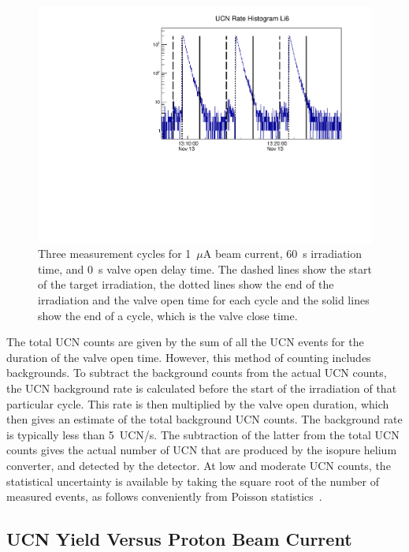 \begin{figure}[h!]
  \centering
  \includegraphics[width=1.0\textwidth]{UCNRate_with_lines_logy.pdf}
  \caption[UCN cycles of measurement]{Three measurement cycles for
    1~$\mu$A beam current, 60~s irradiation time, and 0~s valve open
    delay time. The dashed lines show the start of the target
    irradiation, the dotted lines show the end of the irradiation and
    the valve open time for each cycle and the solid lines show the
    end of a cycle, which is the valve close time.}
  \label{fig:UCNRate_with_lines}
\end{figure}

The total UCN counts are given by the sum of all the UCN events for
the duration of the valve open time. However, this method of counting
includes backgrounds. To subtract the background counts from the
actual UCN counts, the UCN background rate is calculated before the
start of the irradiation of that particular cycle. This rate is then
multiplied by the valve open duration, which then gives an estimate of
the total background UCN counts. The background rate is typically less
than 5~UCN/s. The subtraction of the latter from the total UCN counts
gives the actual number of UCN that are produced by the isopure helium
converter, and detected by the detector. At low and moderate UCN
counts, the statistical uncertainty is available by taking the square
root of the number of measured events, as follows conveniently from
Poisson statistics~\cite{pomme2015uncertainty}.
\subsection{UCN Yield Versus Proton Beam Current}


